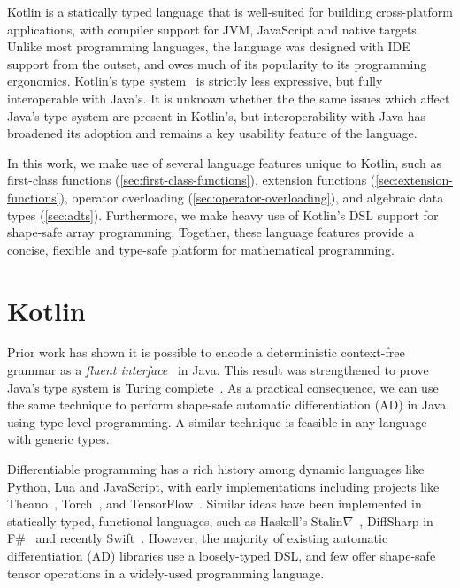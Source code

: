 \documentclass[12pt,initial,twoside,maitrise]{dms}
\numberwithin{equation}{section}
\numberwithin{table}{chapter}
\numberwithin{figure}{chapter}
\begin{document}
Kotlin is a statically typed language that is well-suited for building cross-platform applications, with compiler support for JVM, JavaScript and native targets. Unlike most programming languages, the language was designed with IDE support from the outset, and owes much of its popularity to its programming ergonomics. Kotlin's type system~\citep{tate2013mixed} is strictly less expressive, but fully interoperable with Java's. It is unknown whether the the same issues which affect Java's type system are present in Kotlin's, but interoperability with Java has broadened its adoption and remains a key usability feature of the language.

In this work, we make use of several language features unique to Kotlin, such as first-class functions (\autoref{sec:first-class-functions}), extension functions (\autoref{sec:extension-functions}), operator overloading (\autoref{sec:operator-overloading}), and algebraic data types (\autoref{sec:adts}). Furthermore, we make heavy use of Kotlin's DSL support for shape-safe array programming. Together, these language features provide a concise, flexible and type-safe platform for mathematical programming.

\section{Kotlin\textorpdfstring{$\nabla$}}\label{sec:kotlingrad}

Prior work has shown it is possible to encode a deterministic context-free grammar as a \textit{fluent interface}~\citep{gil2016formal} in Java. This result was strengthened to prove Java's type system is Turing complete~\citep{Grigore:2017:JGT:3009837.3009871}. As a practical consequence, we can use the same technique to perform shape-safe automatic differentiation (AD) in Java, using type-level programming. A similar technique is feasible in any language with generic types.

Differentiable programming has a rich history among dynamic languages like Python, Lua and JavaScript, with early implementations including projects like Theano~\citep{theano}, Torch~\citep{collobert2002torch}, and TensorFlow~\citep{abadi2016tensorflow}. Similar ideas have been implemented in statically typed, functional languages, such as Haskell's Stalin$\nabla$~\citep{pearlmutter2008using}, DiffSharp in F\#~\citep{baydin-diffsharp} and recently Swift~\citep{swift}. However, the majority of existing automatic differentiation (AD) libraries use a loosely-typed DSL, and few offer shape-safe tensor operations in a widely-used programming language.
\end{document}
